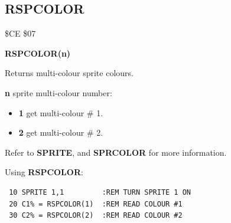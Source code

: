\subsection{RSPCOLOR}
\begin{description}[leftmargin=2cm,style=nextline]
\item [Token:] \$CE \$07
\item [Format:] {\bf RSPCOLOR(n)}
\item [Usage:]  Returns multi-colour sprite colours.

                {\bf n} sprite multi-colour number:

                \begin{itemize}
                    \item {\bf 1} get multi-colour \# 1.
                    \item {\bf 2} get multi-colour \# 2.
                \end{itemize}

\item [Remarks:] Refer to {\bf SPRITE}, and {\bf SPRCOLOR} for more information.

\item [Example:] Using {\bf RSPCOLOR}:
\begin{tcolorbox}[colback=black,coltext=white]
\verbatimfont{\codefont}
\begin{verbatim}
 10 SPRITE 1,1         :REM TURN SPRITE 1 ON
 20 C1% = RSPCOLOR(1)  :REM READ COLOUR #1
 30 C2% = RSPCOLOR(2)  :REM READ COLOUR #2
\end{verbatim}
\end{tcolorbox}
\end{description}


\newpage
